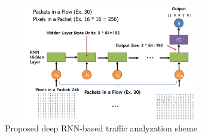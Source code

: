 \documentclass[10pt, twoside, jounal]{IEEEtran}
\begin{document}
\begin{figure}[!t]
\centering
\setlength{\abovecaptionskip}{0pt}
\setlength{\belowcaptionskip}{0pt}
{
\includegraphics[width=3.6in, height=2.0in]{fig2.jpg}
\caption{Proposed deep RNN-based traffic analyzation sheme}
\label{fig2}
}
\end{figure}

\end{document}
